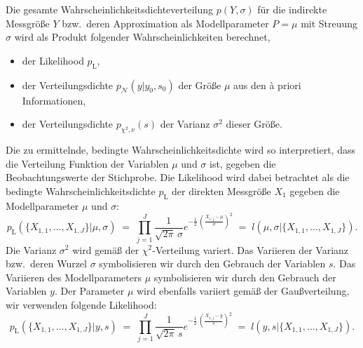Die gesamte Wahrscheinlichkeitsdichteverteilung $p(Y,\sigma)$ für die indirekte Messgröße
$Y$ bzw.\ deren Approximation als Modellparameter $P = \mu$ mit Streuung $\sigma$ wird als Produkt
folgender Wahrscheinlichkeiten berechnet,
\begin{itemize}
\item der Likelihood $p_\mathrm{L}$, 
\item der Verteilungsdichte $p_\mathcal{N}(y | y_0, s_0)$ der Größe $\mu$ aus den {\`a} priori Informationen,
\item der Verteilungsdichte $p_{\chi^2,\nu}(s)$ der Varianz $\sigma^2$ dieser Größe.
\end{itemize}
Die zu ermittelnde, bedingte Wahrscheinlichkeitsdichte wird so interpretiert, dass die Verteilung Funktion
der Variablen $\mu$ und $\sigma$ ist, gegeben die Beobachtungswerte der Stichprobe. Die Likelihood wird
dabei betrachtet als die bedingte Wahrscheinlichkeitsdichte $p_\mathrm{L}$ der
direkten Messgröße $X_1$ gegeben die Modellparameter $\mu$ und $\sigma$:
\begin{equation}
p_\mathrm{L}(\{X_{1,1}, \dots, X_{1,J}\} | \mu, \sigma) \; = \;
\prod\limits_{j=1}^J \frac{1}{\sqrt{2 \pi} \, \sigma}
 e^{- \frac{1}{2} \, \left( \frac{X_{1,j} - \mu}{\sigma} \right)^2 }  \; = \;
l(\mu, \sigma | \{X_{1,1}, \dots, X_{1,J}\}).
\end{equation}
Die Varianz $\sigma^2$ wird gemäß der $\chi^2$-Verteilung variert. Das Variieren der Varianz
bzw.\ deren Wurzel $\sigma$ symbolisieren wir durch den Gebrauch der Variablen $s$.
Das Variieren des Modellparameters $\mu$ symbolisieren wir durch den Gebrauch der Variablen $y$.
Der Parameter $\mu$ wird ebenfalls variiert gemäß der Gaußverteilung, wir verwenden folgende
Likelihood:
\begin{equation}
p_\mathrm{L}(\{X_{1,1}, \dots, X_{1,J}\} | y, s) \; = \;
\prod\limits_{j=1}^J \frac{1}{\sqrt{2 \pi} \, s}
 e^{- \frac{1}{2} \, \left( \frac{X_{1,j} - y}{s} \right)^2 }  \; = \;
l(y, s | \{X_{1,1}, \dots, X_{1,J}\}).
\end{equation}

